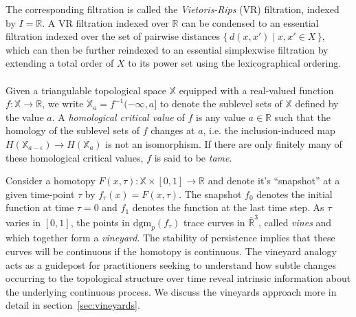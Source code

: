 \documentclass{siamart190516}
\begin{document}
The corresponding filtration is called the \emph{Vietoris-Rips} (VR) filtration, indexed by $I = \mathbb{R}$. 
A VR filtration indexed over $\mathbb{R}$  can be condensed to an essential filtration indexed over the set of pairwise distances $\{\, d(x,x') \; | \; x,x' \in X \, \}$, 
which can then be further reindexed to an essential simplexwise filtration by extending a total order of $X$ to its power set 
using the lexicographical ordering. 
\\
\\
Given a triangulable topological space $\mathbb{X}$ equipped with a
real-valued function $f: \mathbb{X} \to \mathbb{R}$, 
we write $\mathbb{X}_a = f^{-1}(-\infty, a]$ to denote the sublevel sets of $\mathbb{X}$ defined by the value $a$. 
A \emph{homological critical value} of $f$ is any value $a \in \mathbb{R}$ such that the homology of the sublevel sets of $f$ changes at $a$, i.e. the inclusion-induced map $H(\mathbb{X}_{a - \epsilon}) \to H(\mathbb{X}_a)$ is not an isomorphism. If there are only finitely many of these homological critical values, $f$ is said to be \emph{tame}. 

Consider a homotopy $F(x,\tau) : \mathbb{X} \times [0,1] \to \mathbb{R}$ and denote it's ``snapshot'' at a given time-point $\tau$ by $f_\tau(x) = F(x,\tau)$.
The snapshot $f_0$ denotes the initial function at time $\tau = 0$ and $f_1$ denotes the function at the last time step. 
As $\tau$ varies in $[0,1]$, the points in $\mathrm{dgm}_p(f_\tau)$ trace  curves in $\bar{\mathbb{R}}^3$, called \emph{vines} and which together form a \emph{vineyard}. 
The stability of persistence implies that these curves will be continuous if the homotopy is continuous.
The vineyard analogy acts as a guidepost for practitioners seeking to understand how subtle changes occurring to the topological structure over time reveal intrinsic information  about the underlying continuous process. We discuss the vineyards approach more in detail in section~\ref{sec:vineyards}.
\end{document}
